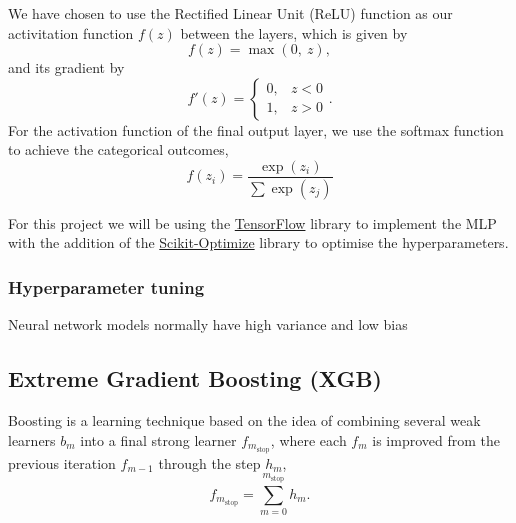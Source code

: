 \documentclass[a4paper, 11pt, twocolumn]{article}
\begin{document}
We have chosen to use the Rectified Linear Unit (ReLU) function as our 
activitation function $f(z)$ between the layers, which is given by 
\begin{equation}
      f(z) = \max (0,\ z),
\end{equation}
and its gradient by 
\begin{equation}
      f'(z) = 
      \begin{cases} 
            0, &  z<0\\
            1, &  z>0
      \end{cases}. 
\end{equation}
For the activation function of the final output layer, we use the softmax 
function to achieve the categorical outcomes,
\begin{equation}
      f(z_i)=\frac{\exp(z_i)}{\sum \exp(z_j)}
\end{equation}

For this project we will be using the \href{https://www.tensorflow.org/}
{TensorFlow} library to implement the MLP with the addition of the 
\href{https://scikit-optimize.github.io/}{Scikit-Optimize} library to optimise 
the hyperparameters.

\subsubsection{Hyperparameter tuning}
Neural network models normally have high variance and low bias


\subsection{Extreme Gradient Boosting (XGB)}
Boosting is a learning technique based on the idea of combining several weak 
learners $b_m$ into a final strong learner $f_{m_\text{stop}}$, where each 
$f_m$ is improved from the previous iteration $f_{m-1}$ through the step $h_m$, 
\begin{equation}
      f_{m_\text{stop}} = \sum_{m=0}^{m_\text{stop}} h_m.
\end{equation}
\end{document}
